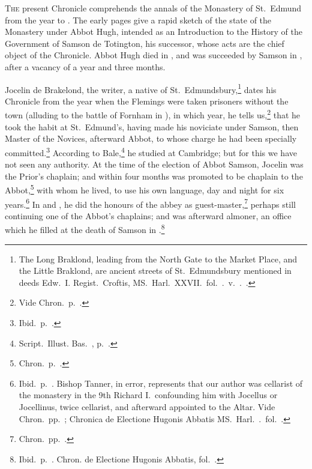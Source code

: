 \documentclass[10pt]{book}
\begin{document}
\vspace{.15cm}

{\setlength{\parskip}{0.0\baselineskip}\setlength{\parindent}{10pt}

\noindent \textsc{The} present Chronicle comprehends the annals of the Monastery of St.\ Edmund from the year  to . The early pages give a rapid sketch of the state of the Monastery under Abbot Hugh, intended as an Introduction to the History of the Government of Samson de Totington, his successor, whose acts are the chief object of the Chronicle. Abbot Hugh died in , and was succeeded by Samson in , after a vacancy of a year and three months.

Jocelin de Brakelond, the writer, a native of St.\ Edmundsbury,\footnote{The Long Braklond, leading from the North Gate to the Market Place, and the Little Braklond, are ancient streets of St.\ Edmundsbury mentioned in deeds  Edw.\ I. Regist.\ Croftis, MS.\ Harl.\ XXVII.\ fol.\ .\ v.\ .\ .} dates his Chronicle from the year when the Flemings were taken prisoners without the town (alluding to the battle of Fornham in ), in which year, he tells us,\footnote{Vide Chron.\ p.\ .} that he took the habit at St.\ Edmund's, having made his noviciate under Samson, then Master of the Novices, afterward Abbot, to whose charge he had been specially committed.\footnote{Ibid.\ p.\ .} According to Bale,\footnote{Script.\ Illust. Bas.\ , p.\ .} he studied at Cambridge; but for this we have not seen any authority. At the time of the election of Abbot Samson, Jocelin was the Prior's chaplain; and within four months was promoted to be chaplain to the Abbot,\footnote{Chron.\ p.\ .} with whom he lived, to use his own language, day and night for six years.\footnote{Ibid.\ p.\ . Bishop Tanner, in error, represents that our author was cellarist of the monastery in the 9th Richard I.\ confounding him with Jocellus or Jocellinus, twice cellarist, and afterward appointed to the Altar. Vide Chron.\ pp.\ ; Chronica de Electione Hugonis Abbatis MS.\ Harl.\ .\ fol.\ .} In  and , he did the honours of the abbey as guest-master,\footnote{Chron.\ pp.\ .} perhaps still continuing one of the Abbot's chaplains; and was afterward almoner, an office which he filled at the death of Samson in .\footnote{Ibid.\ p.\ . Chron. de Electione Hugonis Abbatis, fol.\ .}

}
\end{document}
